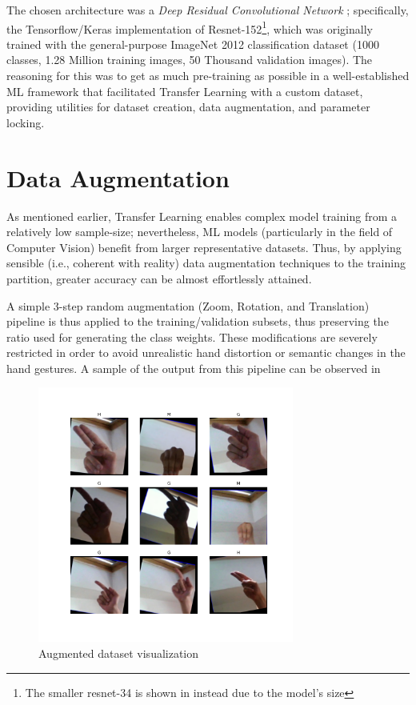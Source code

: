 \documentclass{scrartcl}
\begin{document}
  The chosen architecture was a \emph{Deep Residual Convolutional Network} \autocite{he2015deep}; specifically, the Tensorflow/Keras implementation of Resnet-152\footnote{The smaller resnet-34 is shown in  instead due to the model's size}, which was originally trained with the general-purpose ImageNet 2012 classification dataset (1000 classes, 1.28 Million training images, 50 Thousand validation images). The reasoning for this was to get as much pre-training as possible in a well-established ML framework that facilitated Transfer Learning with a custom dataset, providing utilities for dataset creation, data augmentation, and parameter locking.

\section{Data Augmentation}

  As mentioned earlier, Transfer Learning enables complex model training from a relatively low sample-size; nevertheless, ML models (particularly in the field of Computer Vision) benefit from larger representative datasets. Thus, by applying sensible (i.e., coherent with reality) data augmentation techniques to the training partition, greater accuracy can be almost effortlessly attained.

  A simple 3-step random augmentation (Zoom, Rotation, and Translation) pipeline is thus applied to the training/validation subsets, thus preserving the ratio used for generating the class weights. These modifications are severely restricted in order to avoid unrealistic hand distortion or semantic changes in the hand gestures. A sample of the output from this pipeline can be observed in 

  \begin{figure}[ht]
    \centering
    \includegraphics[width=0.75\textwidth]{../figures/aug_overview.png}
    \caption{Augmented dataset visualization}
    \label{fig:aug_overview}
  \end{figure}
\end{document}
